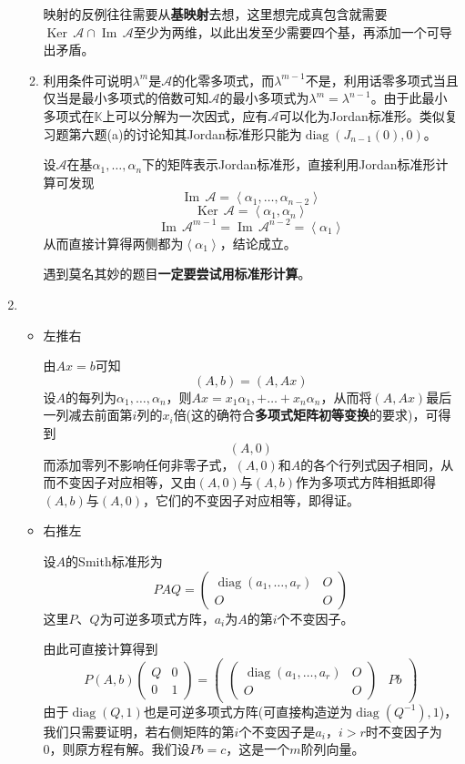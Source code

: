 \documentclass[a4paper,UTF8,fontset=windows,AutoFakeBold]{ctexart}
\DeclareMathOperator{\diag}{diag}
\DeclareMathOperator{\im}{Im\,}
\DeclareMathOperator{\Ker}{Ker\,}
\newcommand*{\ma}{\mathcal{A}}
\newcommand*{\note}{\noindent *}
\begin{document}
\begin{enumerate}
\begin{enumerate}
        \note 映射的反例往往需要从\textbf{基映射}去想，这里想完成真包含就需要$\Ker\ma\cap\im\ma$至少为两维，以此出发至少需要四个基，再添加一个可导出矛盾。

        \item 利用条件可说明$\lambda^m$是$\ma$的化零多项式，而$\lambda^{m-1}$不是，利用话零多项式当且仅当是最小多项式的倍数可知$\ma$的最小多项式为$\lambda^m=\lambda^{n-1}$。由于此最小多项式在$\mathbb{K}$上可以分解为一次因式，应有$\ma$可以化为Jordan标准形。类似复习题第六题(a)的讨论知其Jordan标准形只能为$\diag(J_{n-1}(0),0)$。
        
        设$\ma$在基$\alpha_1,\dots,\alpha_n$下的矩阵表示Jordan标准形，直接利用Jordan标准形计算可发现
        $$\im\ma=\left<\alpha_1,\dots,\alpha_{n-2}\right>$$
        $$\Ker\ma=\left<\alpha_1,\alpha_n\right>$$
        $$\im\ma^{m-1}=\im\ma^{n-2}=\left<\alpha_1\right>$$
        从而直接计算得两侧都为$\left<\alpha_1\right>$，结论成立。

        \note 遇到莫名其妙的题目\textbf{一定要尝试用标准形计算}。
    \end{enumerate}

    \item
    \begin{itemize}
        \item 左推右
        
        由$Ax=b$可知
        $$(A,b)=(A,Ax)$$
        设$A$的每列为$\alpha_1,\dots,\alpha_n$，则$Ax=x_1\alpha_1,+\dots+x_n\alpha_n$，从而将$(A,Ax)$最后一列减去前面第$i$列的$x_i$倍(这的确符合\textbf{多项式矩阵初等变换}的要求)，可得到
        $$(A,0)$$
        而添加零列不影响任何非零子式，$(A,0)$和$A$的各个行列式因子相同，从而不变因子对应相等，又由$(A,0)$与$(A,b)$作为多项式方阵相抵即得$(A,b)$与$(A,0)$，它们的不变因子对应相等，即得证。
        
        \item 右推左
        
        设$A$的Smith标准形为
        $$PAQ=\begin{pmatrix}\diag(a_1,\dots,a_r)&O\\O&O\end{pmatrix}$$
        这里$P$、$Q$为可逆多项式方阵，$a_i$为$A$的第$i$个不变因子。

        由此可直接计算得到
        $$P(A,b)\begin{pmatrix}Q&\mathrm{0}\\\mathrm{0}&1\end{pmatrix}=\begin{pmatrix}\begin{pmatrix}\diag(a_1,\dots,a_r)&O\\O&O\end{pmatrix}&Pb\end{pmatrix}$$
        由于$\diag(Q,1)$也是可逆多项式方阵(可直接构造逆为$\diag(Q^{-1}),1$)，我们只需要证明，若右侧矩阵的第$i$个不变因子是$a_i$，$i>r$时不变因子为0，则原方程有解。我们设$Pb=c$，这是一个$m$阶列向量。


\end{itemize}
\end{enumerate}
\end{document}
